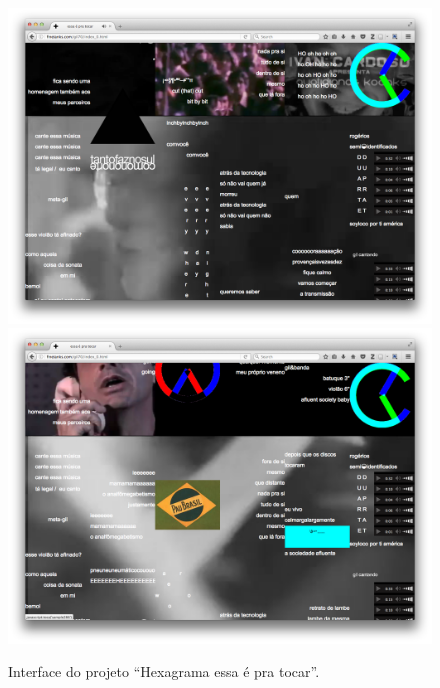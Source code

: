 \begin{figure}

\includegraphics[width=1\textwidth]{pictures/cap1/gil701}
\label{fig:gil701}
\includegraphics[width=1\textwidth]{pictures/cap1/gil702}
\caption{Interface do projeto ``Hexagrama essa é pra tocar''.}
\label{fig:gil702}
\end{figure}

